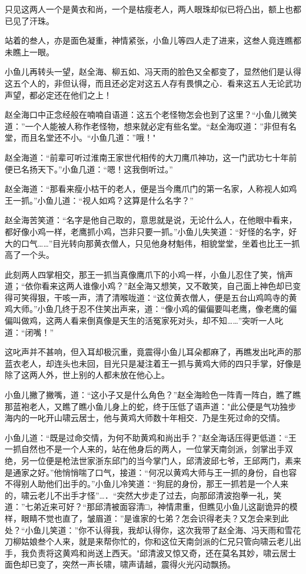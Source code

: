 \documentclass[12pt,oneside]{book}
\begin{document}
只见这两人一个是黄衣和尚，一个是枯瘦老人，两人眼珠却似已将凸出，额上也都已见了汗珠。

站着的叁人，亦是面色凝重，神情紧张，小鱼儿等四人走了进来，这叁人竟连瞧都未瞧上一眼。

小鱼儿再转头一望，赵全海、柳五如、冯天雨的脸色又全都变了，显然他们是认得这五个人的，非但认得，而且还必定对这五人存有畏惧之心．看来这五人无论武功声望，都必定还在他们之上！

赵全海口中正念经般在喃喃自语道：这五个老怪物怎会也到了这里？``小鱼儿微笑道：''一个人能被人称作老怪物，想来就必定有些名堂。``赵全海叹道：''非但有名堂，而且名堂还不小。``小鱼几道：''哦！"

赵全海道：``前辈可听过淮南王家世代相传的大刀鹰爪神功，这一门武功七十年前便已名扬天下。''小鱼几道：``嗯！这我倒听过。''

赵全海道：``那看来瘦小枯干的老人，便是当今鹰爪门的第一名家，人称视人如鸡王一抓。''小鱼儿道：``视人如鸡？这算是什么名字？''

赵全海苦笑道：``名字是他自己取的，意思就是说，无论什么人，在他眼中看来，都好像小鸡一样，老鹰抓小鸡，岂非只要一抓。''小鱼儿失笑道：``好怪的名字，好大的口气\ldots\ldots{}''目光转向那黄衣僧人，只见他身材魁伟，相貌堂堂，坐着也比王一抓高了一个头。

此刻两人四掌相交，那王一抓当真像鹰爪下的小鸡一样，小鱼儿忍住了笑，悄声道；``依你看来这两人谁像小鸡？''赵全海又想笑，又不敢笑，自己面上神色却已变得可笑得狠，干咳一声，清了清喉咙道：``这位黄衣僧人，便是五台山鸡鸣寺的黄鸡大师。''小鱼几终于忍不住笑出声来，道：``像小鸡的偏偏要叫老鹰，像老鹰的偏偏叫做鸡，这两人看来倒真像是天生的活冤家死对头，却不知\ldots\ldots{}''突听一人叱道：``闭嘴！''

这叱声并不甚响，但入耳却极沉重，竟震得小鱼儿耳朵都麻了，再瞧发出叱声的那蓝衣老人，却连头也未回，目光只是凝注着王一抓与黄鸡大师的四只手掌，好像是除了这两人外，世上别的人都未放在他心上。

小鱼儿撇了撇嘴，道：``这小子又是什么角色？''赵全海睑色一阵青一阵白，瞧了瞧那蓝袍老人，又瞧了瞧小鱼儿身上的蛇，终于压低了语声道："此公便是气功独步海内的一叱开山啸云居士，他与黄鸡大师数十年相交．乃是生死过命的交情。

小鱼儿道：``既是过命交情，为何不助黄鸡和尚出手？''赵全海话压得更低道：``王一抓自然也不是一个人来的，站在他身后的两人，一位掌天南剑派，剑掌出手双绝，另一位便是枪法世家浙东邱门的当今掌门人，邱清波邱七爷，王邱两门，素来是通家之好。''他悄悄喘了口气，接道：``何况以黄鸡大师与王一抓的身份，自也容不得别人助他们出手的。''小鱼儿冷笑道：``狗屁的身份，那王一抓若是一个人来的，啸云老儿不出手才怪''\ldots．``突然大步走了过去，向那邱清波抱拳一礼，笑道：''七弟近来可好？``那邱清被面容清□，神情肃重，但瞧见小鱼儿这副诡异的模样，眼睛不觉也直了，皱眉道：''是谁家的七弟？怎会识得老夫？又怎会来到此处？``小鱼儿笑道：''你不认得我，我却认得你，这次我带了赵全海、冯天雨和雪花刀柳姑娘叁个人来，就是来帮你忙的，你和这位天南剑派的仁兄只管向啸云老儿出手，我负责将这黄鸡和尚送上西天。"邱清波又惊又奇，还在莫名其妙，啸云居士面色却已变了，突然一声长啸，啸声请越，震得火光闪动飘扬。
\end{document}
